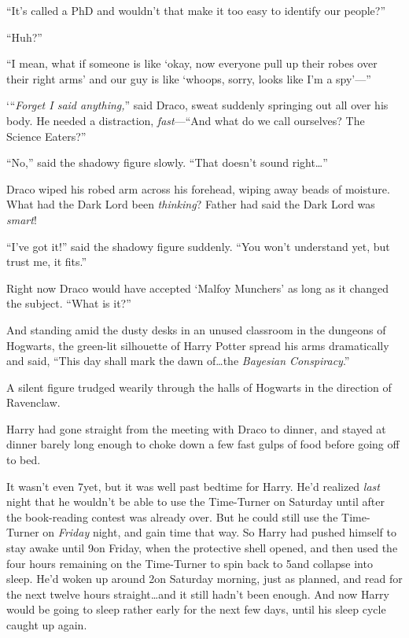 “It’s called a PhD and wouldn’t that make it too easy to identify our people?”

“Huh?”

“I mean, what if someone is like ‘okay, now everyone pull up their robes over their right arms’ and our guy is like ‘whoops, sorry, looks like I’m a spy’—”

‘“\emph{Forget I said anything,}” said Draco, sweat suddenly springing out all over his body. He needed a distraction, \emph{fast}—“And what do we call ourselves? The Science Eaters?”

“No,” said the shadowy figure slowly. “That doesn’t sound right…”

Draco wiped his robed arm across his forehead, wiping away beads of moisture. What had the Dark Lord been \emph{thinking}? Father had said the Dark Lord was \emph{smart}!

“I’ve got it!” said the shadowy figure suddenly. “You won’t understand yet, but trust me, it fits.”

Right now Draco would have accepted ‘Malfoy Munchers’ as long as it changed the subject. “What is it?”

And standing amid the dusty desks in an unused classroom in the dungeons of Hogwarts, the green-lit silhouette of Harry Potter spread his arms dramatically and said, “This day shall mark the dawn of…the \emph{Bayesian Conspiracy}.”

\later

A silent figure trudged wearily through the halls of Hogwarts in the direction of Ravenclaw.

Harry had gone straight from the meeting with Draco to dinner, and stayed at dinner barely long enough to choke down a few fast gulps of food before going off to bed.

It wasn’t even 7\pm yet, but it was well past bedtime for Harry. He’d realized \emph{last} night that he wouldn’t be able to use the Time-Turner on Saturday until after the book-reading contest was already over. But he could still use the Time-Turner on \emph{Friday} night, and gain time that way. So Harry had pushed himself to stay awake until 9\pm on Friday, when the protective shell opened, and then used the four hours remaining on the Time-Turner to spin back to 5\pm and collapse into sleep. He’d woken up around 2\am on Saturday morning, just as planned, and read for the next twelve hours straight…and it still hadn’t been enough. And now Harry would be going to sleep rather early for the next few days, until his sleep cycle caught up again.

